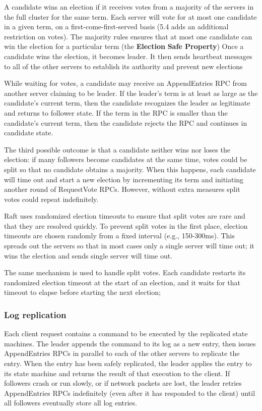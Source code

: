 \documentclass[11pt]{article}
\begin{document}
A candidate wins an election if it receives votes from a majority of the servers in the full
cluster for the same term. Each server will vote for at most one candidate in a given term, on a
first-come-first-served basis (5.4 adds an additional restriction on votes). The majority rules
ensures that at most one candidate can win the election for a particular term (the \textbf{Election}
\textbf{Safe Property}) Once a candidate wins the election, it becomes leader. It then sends heartbeat
messages to all of the other servers to establish its authority and prevent new elections

While waiting for votes, a candidate may receive an AppendEntries RPC from another server claiming
to be leader. If the leader's term is at least as large as the candidate's current term, then
the candidate recognizes the leader as legitimate and returns to follower state. If the term in
the RPC is smaller than the candidate's current term, then the candidate rejects the RPC and
continues in candidate state.

The third possible outcome is that a candidate neither wins nor loses the election: if many
followers become candidates at the same time, votes could be split so that no candidate obtains
a majority. When this happens, each candidate will time out and start a new election by
incrementing its term and initiating another round of RequestVote RPCs. However, without extra
measures split votes could repeat indefinitely.

Raft uses randomized election timeouts to ensure that split votes are rare and that they are
resolved quickly. To prevent split votes in the first place, election timeouts are chosen
randomly from a fixed interval (e.g., 150-300ms). This spreads out the servers so that in most
cases only a single server will time out; it wins the election and sends single server will time
out.

The same mechanism is used to handle split votes. Each candidate restarts its randomized
election timeout at the start of an election, and it waits for that timeout to elapse before
starting the next election;
\subsubsection{Log replication}
\label{sec:org6961b5e}
Each client request contains a command to be executed by the replicated state machines. The
leader appends the command to its log as a new entry, then issues AppendEntries RPCs in parallel
to each of the other servers to replicate the entry. When the entry has been safely replicated,
the leader applies the entry to its state machine and returns the result of that execution to
the client. If followers crash or run slowly, or if network packets are lost, the leader retries
AppendEntries RPCs indefinitely (even after it has responded to the client) until all followers
eventually store all log entries.
\end{document}
